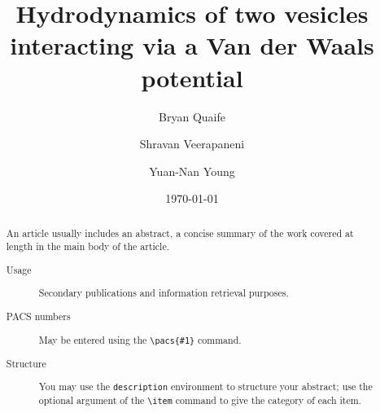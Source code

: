 \documentclass[%
preprint,
 amsmath,amssymb,
 aps,
]{revtex4-1}
\begin{document}

\title{Hydrodynamics of two vesicles interacting via a Van der Waals potential}%

\author{Bryan Quaife}
\author{Shravan Veerapaneni}%
%
\author{Yuan-Nan Young}%
%


%

\date{\today}%

\begin{abstract}
An article usually includes an abstract, a concise summary of the work
covered at length in the main body of the article. 
\begin{description}
\item[Usage]
Secondary publications and information retrieval purposes.
\item[PACS numbers]
May be entered using the \verb+\pacs{#1}+ command.
\item[Structure]
You may use the \texttt{description} environment to structure your abstract;
use the optional argument of the \verb+\item+ command to give the category of each item. 
\end{description}
\end{abstract}

\maketitle
\end{document}
